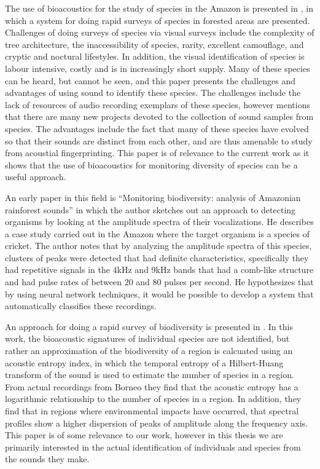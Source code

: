 \documentclass[12pt,oneside]{book}
\begin{document}
The use of bioacoustics for the study of species in the Amazon is
presented in \cite{riede93}, in which a system for doing rapid surveys
of species in forested areas are presented.  Challenges of doing
surveys of species via visual surveys include the complexity of tree
architecture, the inaccessibility of species, rarity, excellent
camouflage, and cryptic and noctural lifestyles.  In addition, the
visual identification of species is labour intensive, costly and is in
increasingly short supply.  Many of these species can be heard, but
cannot be seen, and this paper presents the challenges and advantages
of using sound to identify these species.  The challenges include the
lack of resources of audio recording exemplars of these species,
however mentions that there are many new projects devoted to the
collection of sound samples from species.  The advantages include the
fact that many of these species have evolved so that their sounds are
distinct from each other, and are thus amenable to study from
acoustial fingerprinting.  This paper is of relevance to the current
work as it shows that the use of bioacoustics for monitoring diversity
of species can be a useful approach.

An early paper in this field is ``Monitoring biodiversity: analysis of
Amazonian rainforest sounds'' \cite{riede93} in which the author
sketches out an approach to detecting organisms by looking at the
amplitude spectra of their vocalizations.  He describes a case study
carried out in the Amazon where the target organism is a species of
cricket.  The author notes that by analyzing the amplitude spectra of
this species, clusters of peaks were detected that had definite
characteristics, specifically they had repetitive signals in the 4kHz
and 9kHz bands that had a comb-like structure and had pulse rates of
between 20 and 80 pulses per second.  He hypothesizes that by using
neural network techniques, it would be possible to develop a system
that automatically classifies these recordings.

An approach for doing a rapid survey of biodiversity is presented in
\cite{sueur08}.  In this work, the bioacoustic signatures of
individual species are not identified, but rather an approximation of
the biodiversity of a region is calcuated using an acoustic entropy
index, in which the temporal entropy of a Hilbert-Huang transform of
the sound is used to estimate the number of species in a region.  From
actual recordings from Borneo they find that the acoustic entropy has
a logarithmic relationship to the number of species in a region.  In
addition, they find that in regions where environmental impacts have
occurred, that spectral profiles show a higher dispersion of peaks of
amplitude along the frequency axis.  This paper is of some relevance
to our work, however in this thesis we are primarily interested in the
actual identification of individuals and species from the sounds they
make.
\end{document}
